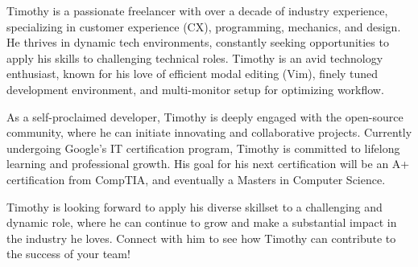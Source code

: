 
\begin{cvparagraph}
Timothy is a passionate freelancer with over a decade of industry experience, specializing in customer experience (CX), programming, mechanics, and design. He thrives in dynamic tech environments, constantly seeking opportunities to apply his skills to challenging technical roles. Timothy is an avid technology enthusiast, known for his love of efficient modal editing (Vim), finely tuned development environment, and multi-monitor setup for optimizing workflow. 

As a self-proclaimed developer, Timothy is deeply engaged with the open-source community, where he can initiate innovating and collaborative projects. Currently undergoing Google's IT certification program, Timothy is committed to lifelong learning and professional growth. His goal for his next certification will be an A+ certification from CompTIA, and eventually a Masters in Computer Science.

Timothy is looking forward to apply his diverse skillset to a challenging and dynamic role, where he can continue to grow and make a substantial impact in the industry he loves. Connect with him to see how Timothy can contribute to the success of your team!
\end{cvparagraph}
